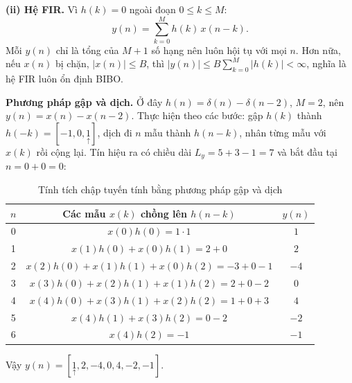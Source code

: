 \documentclass[12pt,a4paper]{article}
\newcommand{\org}[1]{\underset{\uparrow}{#1}}
\begin{document}
\textbf{(ii) Hệ FIR.} Vì $h(k) = 0$ ngoài đoạn $0 \le k \le M$:
\begin{equation}
    y(n) = \sum_{k=0}^{M} h(k)\, x(n-k).
\end{equation}
Mỗi $y(n)$ chỉ là tổng của $M + 1$ số hạng nên luôn hội tụ với mọi $n$. Hơn nữa, nếu $x(n)$ bị chặn, $|x(n)| \le B$, thì $|y(n)| \le B \sum_{k=0}^{M} |h(k)| < \infty$, nghĩa là hệ FIR luôn ổn định BIBO.

\textbf{Phương pháp gập và dịch.} Ở đây $h(n) = \delta(n) - \delta(n-2)$, $M = 2$, nên $y(n) = x(n) - x(n-2)$. Thực hiện theo các bước: gập $h(k)$ thành $h(-k) = [-1, 0, \org{1}]$, dịch đi $n$ mẫu thành $h(n-k)$, nhân từng mẫu với $x(k)$ rồi cộng lại. Tín hiệu ra có chiều dài $L_y = 5 + 3 - 1 = 7$ và bắt đầu tại $n = 0 + 0 = 0$:
\begin{table}[H]
\centering
\begin{tabular}{c|c|c}
\toprule
$n$ & Các mẫu $x(k)$ chồng lên $h(n-k)$ & $y(n)$ \\
\midrule
0 & $x(0)h(0) = 1 \cdot 1$ & $1$ \\
1 & $x(1)h(0) + x(0)h(1) = 2 + 0$ & $2$ \\
2 & $x(2)h(0) + x(1)h(1) + x(0)h(2) = -3 + 0 - 1$ & $-4$ \\
3 & $x(3)h(0) + x(2)h(1) + x(1)h(2) = 2 + 0 - 2$ & $0$ \\
4 & $x(4)h(0) + x(3)h(1) + x(2)h(2) = 1 + 0 + 3$ & $4$ \\
5 & $x(4)h(1) + x(3)h(2) = 0 - 2$ & $-2$ \\
6 & $x(4)h(2) = -1$ & $-1$ \\
\bottomrule
\end{tabular}
\caption{Tính tích chập tuyến tính bằng phương pháp gập và dịch}
\end{table}
\noindent Vậy $y(n) = [\org{1}, 2, -4, 0, 4, -2, -1]$.
\end{document}
